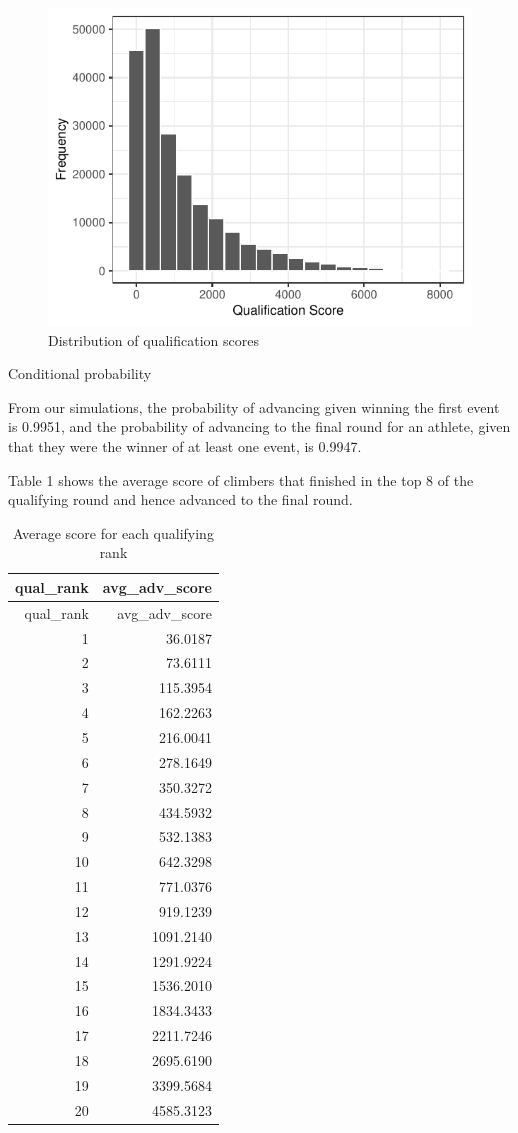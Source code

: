 \documentclass[
  12pt,
]{article}
\begin{document}
\begin{figure}
\centering
\includegraphics{draft_files/figure-latex/unnamed-chunk-3-1.pdf}
\caption{Distribution of qualification scores}
\end{figure}

Conditional probability

From our simulations, the probability of advancing given winning the
first event is 0.9951, and the probability of advancing to the final
round for an athlete, given that they were the winner of at least one
event, is 0.9947.

Table 1 shows the average score of climbers that finished in the top 8
of the qualifying round and hence advanced to the final round.

\begin{longtable}[]{@{}rr@{}}
\caption{Average score for each qualifying rank}\tabularnewline
\toprule
qual\_rank & avg\_adv\_score \\
\midrule
\endfirsthead
\toprule
qual\_rank & avg\_adv\_score \\
\midrule
\endhead
1 & 36.0187 \\
2 & 73.6111 \\
3 & 115.3954 \\
4 & 162.2263 \\
5 & 216.0041 \\
6 & 278.1649 \\
7 & 350.3272 \\
8 & 434.5932 \\
9 & 532.1383 \\
10 & 642.3298 \\
11 & 771.0376 \\
12 & 919.1239 \\
13 & 1091.2140 \\
14 & 1291.9224 \\
15 & 1536.2010 \\
16 & 1834.3433 \\
17 & 2211.7246 \\
18 & 2695.6190 \\
19 & 3399.5684 \\
20 & 4585.3123 \\
\bottomrule
\end{longtable}
\end{document}
